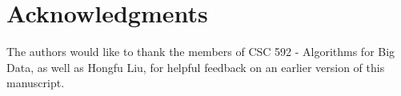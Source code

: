 \section{Acknowledgments}
\label{sec:acknowledgements}


The authors would like to thank the members of CSC 592 - Algorithms for Big Data, as well as Hongfu Liu, for helpful feedback on an earlier version of this manuscript.
